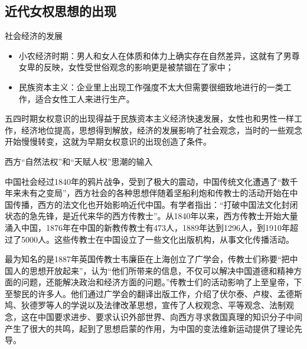 \subsection{近代女权思想的出现}
\begin{frame}{社会经济的发展}
    \begin{block}{}
        \begin{itemize}
            \item 小农经济时期：男人和女人在体质和体力上确实存在自然差异，这就有了男尊女卑的反映，女性受世俗观念的影响更是被禁锢在了家中；
            \item 民族资本主义：企业里上出现工作强度不太大但需要很细致地进行的一类工作，适合女性工人来进行生产。
        \end{itemize}
    \end{block}
    \begin{block}{}
        五四时期女权意识的出现得益于民族资本主义经济快速发展，女性也和男性一样工作，经济地位提高，思想得到解放，经济的发展影响了社会观念，当时的一些观念开始慢慢转变，这就为早期女权意识的出现创造了条件。
    \end{block}
\end{frame}

\begin{frame}{西方“自然法权”和“天赋人权”思潮的输入}
    \begin{block}{}
        中国社会经过1840年的鸦片战争，受到了极大的震动，中国传统文化遭遇了“数千年来未有之变局”，西方社会的各种思想伴随着坚船利炮和传教士的活动开始在中国传播，西方的法文化也开始影响近代中国。有学者指出：“打破中国法文化封闭状态的急先锋，是近代来华的西方传教士”。从1840年以来，西方传教士开始大量涌入中国，1876年在中国的新教传教士有473人，1889年达到1296人，到1910年超过了5000人。这些传教士在中国设立了一些文化出版机构，从事文化传播活动。
    \end{block}
    \begin{block}{}
        最为知名的是1887年英国传教士韦廉臣在上海创立了广学会，传教士们称要“把中国人的思想开放起来”，认为“他们所带来的信息，不仅可以解决中国道德和精神方面的问题，还能解决政治和经济方面的问题。”传教士们的活动影响了上至皇帝，下至黎民的许多人。他们通过广学会的翻译出版工作，介绍了伏尔泰、卢梭、孟德斯鸠、狄德罗等人的学说以及法律改革思想，宣传了人权观念、平等观念、法制观念，这在中国要求进步、要求认识外部世界、向西方寻求救国真理的知识分子中间产生了很大的共鸣，起到了思想启蒙的作用，为中国的变法维新运动提供了理论先导。
    \end{block}
\end{frame}

